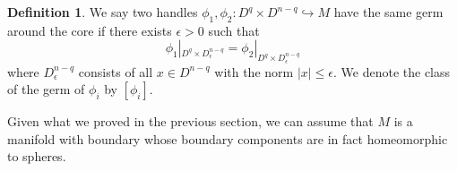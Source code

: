 \documentclass[a4paper]{amsart}
\theoremstyle{definition}
\newtheorem{defn}[thm]{Definition}
\theoremstyle{remark}
\numberwithin{equation}{section}
\begin{document}
\begin{defn}\label{germ}
We say two handles $\phi_1, \phi_2: D^q\times D^{n-q}\hookrightarrow M$ have the same germ around the core if there exists $\epsilon>0$ such that 
\[
\phi_1|_{D^q\times D^{n-q}_{\epsilon}}=\phi_2|_{D^q\times D^{n-q}_{\epsilon}}
\]
where $D^{n-q}_{\epsilon}$ consists of all $x\in D^{n-q}$ with the norm $|x|\leq \epsilon$. We denote the class of the germ of $\phi_i$ by $[\phi_i]$. 
\end{defn}
Given what we proved in the previous section, we can assume that $M$ is a manifold with boundary whose boundary components are in fact homeomorphic to spheres. %
\end{document}

